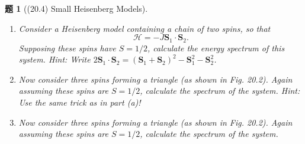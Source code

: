 \documentclass[UTF8,10pt,a4paper]{article}
\theoremstyle{Problem}
\newtheorem{prob}{题}
\theoremstyle{Solution}
\begin{document}
\begin{prob}[(20.4) Small Heisenberg Models]
    \begin{enumerate}
        \item[(a)] Consider a Heisenberg model containing a chain of two spins, so that
        \[
            \mathcal{H}=-J\bm{S}_1\cdot\bm{S}_2.
        \]
        Supposing these spins have $S=1/2$, calculate the energy spectrum of this system. Hint: Write $2\bm{S}_1\cdot\bm{S}_2=(\bm{S}_1+\bm{S}_2)^2-\bm{S}_1^2-\bm{S}_2^2$.
        \item[(b)] Now consider three spins forming a triangle (as shown in Fig. 20.2). Again assuming these spins are $S=1/2$, calculate the spectrum of the system. Hint: Use the same trick as in part (a)!
        \item[(c)] Now consider three spins forming a triangle (as shown in Fig. 20.2). Again assuming these spins are $S=1/2$, calculate the spectrum of the system.
    \end{enumerate}
\end{prob}
\end{document}
